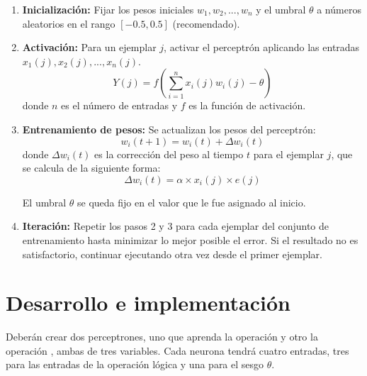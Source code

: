 \begin{enumerate}
  \item \textbf{Inicialización:} Fijar los pesos iniciales \(w_1, w_2, ..., w_n\) y el umbral $\theta$ a números aleatorios en el rango $[-0.5, 0.5]$ (recomendado).
  
  \item \textbf{Activación:} Para un ejemplar $j$, activar el perceptrón aplicando las entradas\\ \(x_1(j), x_2(j), ..., x_n(j)\).
  \[Y(j) = f\left(\sum_{i=1}^{n}x_i(j)w_i(j)-\theta\right)\]
  donde $n$ es el número de entradas y $f$ es la función de activación.
  
  \item \textbf{Entrenamiento de pesos:} Se actualizan los pesos del perceptrón:
  \[w_i(t+1)=w_i(t)+\Delta w_i(t)\]
  donde \(\Delta w_i(t)\) es la corrección del peso al tiempo $t$ para el ejemplar $j$, que se calcula de la siguiente forma:
  \[\Delta w_i(t)=\alpha \times x_i(j) \times e(j)\]
  
  El umbral $\theta$ se queda fijo en el valor que le fue asignado al inicio.
  
  \item \textbf{Iteración:} Repetir los pasos 2 y 3 para cada ejemplar del conjunto de entrenamiento hasta minimizar lo mejor posible el error. Si el resultado no es satisfactorio, continuar ejecutando otra vez desde el primer ejemplar.
  \label{algo:b}
\end{enumerate}

\section{Desarrollo e implementaci\'on}

\noindent Deberán crear dos perceptrones, uno que aprenda la operación  y otro la operación , ambas de tres variables. Cada neurona tendrá cuatro entradas, tres para las entradas de la operación lógica y una para el sesgo $\theta$.\par

